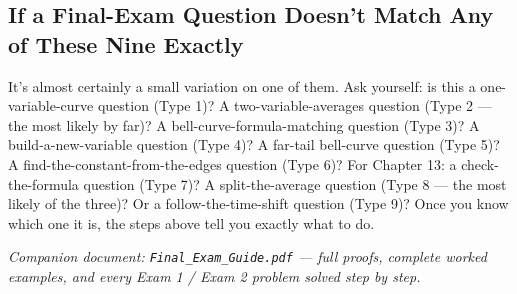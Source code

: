 \documentclass[10pt]{article}
\newcommand{\finalline}[1]{\par\vspace{4pt}\noindent{\color{#1}\rule{\linewidth}{1pt}}\par\vspace{4pt}}
\begin{document}
\subsection*{If a Final-Exam Question Doesn't Match Any of These Nine Exactly}
It's almost certainly a small variation on one of them. Ask yourself: is this a
one-variable-curve question (Type 1)? A two-variable-averages question (Type 2 --- the most
likely by far)? A bell-curve-formula-matching question (Type 3)? A build-a-new-variable
question (Type 4)? A far-tail bell-curve question (Type 5)? A find-the-constant-from-the-edges
question (Type 6)? For Chapter 13: a check-the-formula question (Type 7)? A
split-the-average question (Type 8 --- the most likely of the three)? Or a
follow-the-time-shift question (Type 9)? Once you know which one it is, the steps above tell
you exactly what to do.

\finalline{flagcol}
\begin{center}
\textit{Companion document: \texttt{Final\_Exam\_Guide.pdf} --- full proofs, complete worked
examples, and every Exam 1 / Exam 2 problem solved step by step.}
\end{center}
\end{document}
